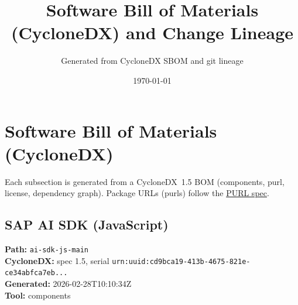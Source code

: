 \documentclass[11pt,a4paper]{article}
\title{\textbf{Software Bill of Materials (CycloneDX) and Change Lineage}}
\author{Generated from CycloneDX SBOM and git lineage}
\date{\today}
\begin{document}
\maketitle
\tableofcontents
\newpage
\section{Software Bill of Materials (CycloneDX)}
Each subsection is generated from a CycloneDX~1.5 BOM (components, purl, license, dependency graph). Package URLs (purls) follow the \href{https://github.com/package-url/purl-spec}{PURL spec}.

\subsection{SAP AI SDK (JavaScript)}
\textbf{Path:} \texttt{ai-sdk-js-main}
\\ \textbf{CycloneDX:} spec 1.5, serial \texttt{urn:uuid:cd9bca19-413b-4675-821e-ce34abfca7eb...}
\\ \textbf{Generated:} 2026-02-28T10:10:34Z
\\ \textbf{Tool:} components
\end{document}
